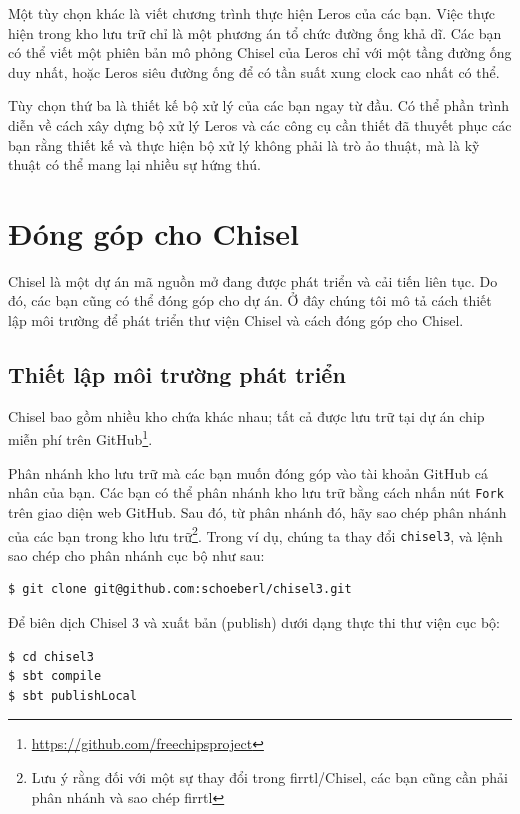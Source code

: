 \documentclass[%
    10pt,
    headinclude, footexclude,
    openright, %
    notitlepage,
    cleardoubleempty,
    headsepline,
    pointlessnumbers,
    bibtotoc, idxtotoc,
    ]{scrbook}
\newcommand{\code}[1]{{\small{\texttt{#1}}}}
\newcommand{\myref}[2]{\href{#1}{#2}}
\renewcommand{\myref}[2]{{#2}{\footnote{\url{#1}}}}
\begin{document}
Một tùy chọn khác là viết chương trình thực hiện Leros của các bạn. Việc thực hiện trong kho lưu trữ chỉ là một phương án tổ chức đường ống khả dĩ. Các bạn có thể viết một phiên bản mô phỏng Chisel của Leros chỉ với một tầng đường ống duy nhất, hoặc Leros siêu đường ống để có tần suất xung clock cao nhất có thể.

Tùy chọn thứ ba là thiết kế bộ xử lý của các bạn ngay từ đầu. Có thể phần trình diễn về cách xây dựng bộ xử lý Leros và các công cụ cần thiết đã thuyết phục các bạn rằng thiết kế và thực hiện bộ xử lý không phải là trò ảo thuật, mà là kỹ thuật có thể mang lại nhiều sự hứng thú. 

\chapter{Đóng góp cho Chisel}


Chisel là một dự án mã nguồn mở đang được phát triển và cải tiến liên tục. Do đó, các bạn cũng có thể đóng góp cho dự án. Ở đây chúng tôi mô tả cách thiết lập môi trường để phát triển thư viện Chisel và cách đóng góp cho Chisel. 

\section{Thiết lập môi trường phát triển}

Chisel bao gồm nhiều kho chứa khác nhau; tất cả được lưu trữ tại
\myref{https://github.com/freechipsproject}{dự án chip miễn phí trên GitHub}.

Phân nhánh kho lưu trữ mà các bạn muốn đóng góp vào tài khoản GitHub cá nhân của bạn. Các bạn có thể phân nhánh kho lưu trữ bằng cách nhấn nút \code{Fork} trên giao diện web GitHub. Sau đó, từ phân nhánh đó, hãy sao chép phân nhánh của các bạn trong kho lưu trữ\footnote{Lưu ý rằng đối với một sự thay đổi trong firrtl/Chisel, các bạn cũng cần phải phân nhánh và sao chép firrtl}. Trong ví dụ, chúng ta thay đổi \code{chisel3}, và lệnh sao chép cho phân nhánh cục bộ như sau: 

\begin{verbatim}
$ git clone git@github.com:schoeberl/chisel3.git
\end{verbatim}

Để biên dịch Chisel 3 và xuất bản (publish) dưới dạng thực thi thư viện cục bộ:
\begin{verbatim}
$ cd chisel3
$ sbt compile
$ sbt publishLocal
\end{verbatim}
\end{document}
